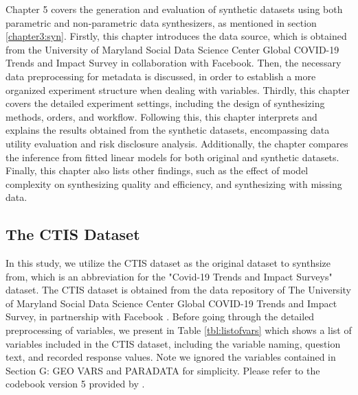 Chapter 5 covers the generation and evaluation of synthetic datasets using both parametric and non-parametric data synthesizers, as mentioned in section \ref{chapter3:syn}. Firstly, this chapter introduces the data source, which is obtained from the University of Maryland Social Data Science Center Global COVID-19 Trends and Impact Survey in collaboration with Facebook. Then, the necessary data preprocessing for metadata is discussed, in order to establish a more organized experiment structure when dealing with variables. Thirdly, this chapter covers the detailed experiment settings, including the design of synthesizing methods, orders, and workflow. Following this, this chapter interprets and explains the results obtained from the synthetic datasets, encompassing data utility evaluation and risk disclosure analysis. Additionally, the chapter compares the inference from fitted linear models for both original and synthetic datasets. Finally, this chapter also lists other findings, such as the effect of model complexity on synthesizing quality and efficiency, and synthesizing with missing data.

\subsection{The CTIS Dataset}
\label{subsec:ctis}
In this study, we utilize the CTIS dataset as the original dataset to synthsize from, which is an abbreviation for the "Covid-19 Trends and Impact Surveys" dataset. The CTIS dataset is obtained from the data repository of The University of Maryland Social Data Science Center Global COVID-19 Trends and Impact Survey, in partnership with Facebook  \citep{salomon2021us}. Before going through the detailed preprocessing of variables, we present in Table \ref{tbl:listofvars} which shows a list of variables included in the CTIS dataset, including the variable naming, question text, and recorded response values.
Note we ignored the variables contained in Section G: GEO VARS and PARADATA for simplicity. Please refer to the codebook version 5 provided by \citet{fan2020university}.
\keepXColumns
\renewcommand{\theadalign}{lc}

